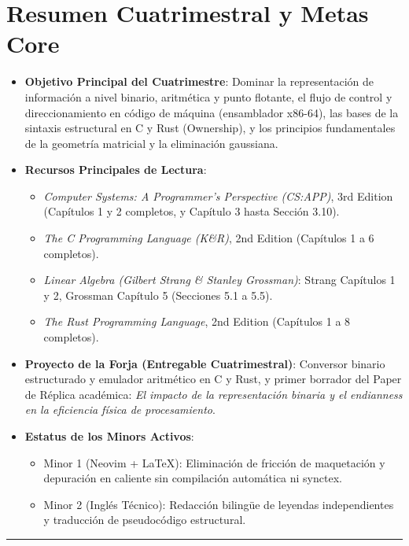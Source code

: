 \documentclass[11pt, a4paper]{article}
\begin{document}
\section{Resumen Cuatrimestral y Metas Core}
\begin{itemize}
    \item \textbf{Objetivo Principal del Cuatrimestre}: Dominar la representación de información a nivel binario, aritmética y punto flotante, el flujo de control y direccionamiento en código de máquina (ensamblador x86-64), las bases de la sintaxis estructural en C y Rust (Ownership), y los principios fundamentales de la geometría matricial y la eliminación gaussiana.
    \item \textbf{Recursos Principales de Lectura}:
    \begin{itemize}
        \item \textit{Computer Systems: A Programmer's Perspective (CS:APP)}, 3rd Edition (Capítulos 1 y 2 completos, y Capítulo 3 hasta Sección 3.10).
        \item \textit{The C Programming Language (K\&R)}, 2nd Edition (Capítulos 1 a 6 completos).
        \item \textit{Linear Algebra (Gilbert Strang \& Stanley Grossman)}: Strang Capítulos 1 y 2, Grossman Capítulo 5 (Secciones 5.1 a 5.5).
        \item \textit{The Rust Programming Language}, 2nd Edition (Capítulos 1 a 8 completos).
    \end{itemize}
    \item \textbf{Proyecto de la Forja (Entregable Cuatrimestral)}: Conversor binario estructurado y emulador aritmético en C y Rust, y primer borrador del Paper de Réplica académica: \textit{El impacto de la representación binaria y el endianness en la eficiencia física de procesamiento}.
    \item \textbf{Estatus de los Minors Activos}:
    \begin{itemize}
        \item Minor 1 (Neovim + \LaTeX): Eliminación de fricción de maquetación y depuración en caliente sin compilación automática ni synctex.
        \item Minor 2 (Inglés Técnico): Redacción bilingüe de leyendas independientes y traducción de pseudocódigo estructural.
    \end{itemize}
\end{itemize}

\noindent\rule{\textwidth}{0.4pt}
\newpage
\end{document}
